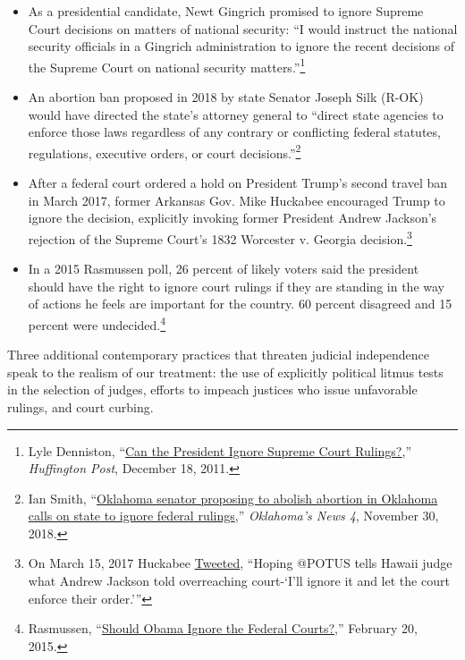 \documentclass[12pt]{article}
\begin{document}
\begin{itemize}
\item As a presidential candidate, Newt Gingrich promised to ignore Supreme Court decisions on matters of national security: ``I would instruct the national security officials in a Gingrich administration to ignore the recent decisions of the Supreme Court on national security matters.''\footnote{Lyle Denniston, ``\href{https://www.huffingtonpost.com/lyle-denniston/gingrich-supreme-court_b_1017418.html}{Can the President Ignore Supreme Court Rulings?},'' \emph{Huffington Post}, December 18, 2011.}

\item An abortion ban proposed in 2018 by state Senator Joseph Silk (R-OK) would have directed the state's attorney general to ``direct state agencies to enforce those laws regardless of any contrary or conflicting federal statutes, regulations, executive orders, or court decisions.''\footnote{Ian Smith, ``\href{https://kfor.com/2018/11/30/oklahoma-senator-proposing-bill-to-abolish-abortion-in-oklahoma-calls-on-state-to-ignore-federal-rulings/}{Oklahoma senator proposing to abolish abortion in Oklahoma calls on state to ignore federal rulings},'' \emph{Oklahoma's News 4}, November 30, 2018.}

\item After a federal court ordered a hold on President Trump's second travel ban in March 2017, former Arkansas Gov. Mike Huckabee encouraged Trump to ignore the decision, explicitly invoking former President Andrew Jackson's rejection of the Supreme Court's 1832 Worcester v. Georgia decision.\footnote{On March 15, 2017 Huckabee \href{https://twitter.com/GovMikeHuckabee/status/842159481601593345}{Tweeted}, ``Hoping @POTUS tells Hawaii judge what Andrew Jackson told overreaching court-`I'll ignore it and let the court enforce their order.''' }

\item In a 2015 Rasmussen poll, 26 percent of likely voters said the president should have the right to ignore court rulings if they are standing in the way of actions he feels are important for the country. 60 percent disagreed and 15 percent were undecided.\footnote{Rasmussen, ``\href{http://www.rasmussenreports.com/public_content/politics/general_politics/february_2015/should_obama_ignore_the_federal_courts}{Should Obama Ignore the Federal Courts?},'' February 20, 2015.}

\end{itemize}

Three additional contemporary practices that threaten judicial independence speak to the realism of our treatment: the use of explicitly political litmus tests in the selection of judges, efforts to impeach justices who issue unfavorable rulings, and court curbing.
\end{document}
